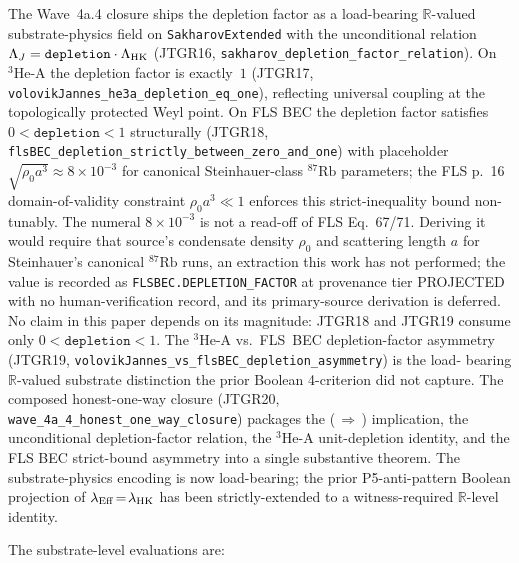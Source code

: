 \documentclass[aps,prd,reprint,nofootinbib,superscriptaddress]{revtex4-2}
\begin{document}
The Wave~4a.4 closure ships the depletion factor as a load-bearing
$\mathbb{R}$-valued substrate-physics field on \texttt{SakharovExtended}
with the unconditional relation $\Lambda_J = \texttt{depletion} \cdot
\Lambda_{\rm HK}$ (JTGR16,
\texttt{sakharov\_depletion\_factor\_relation}). On
$^3\!\text{He-A}$ the depletion factor is exactly~$1$ (JTGR17,
\texttt{volovikJannes\_he3a\_depletion\_eq\_one}), reflecting universal
coupling at the topologically protected Weyl point. On FLS BEC the
depletion factor satisfies $0 < \texttt{depletion} < 1$ structurally
(JTGR18, \texttt{flsBEC\_depletion\_strictly\_between\_zero\_and\_one})
with placeholder $\sqrt{\rho_0 a^3} \approx 8 \times 10^{-3}$ for
canonical Steinhauer-class $^{87}\text{Rb}$ parameters; the FLS p.~16
domain-of-validity constraint $\rho_0 a^3 \ll 1$
\cite{FinazziLiberatiSindoni2012Proc} enforces this
strict-inequality bound non-tunably. The numeral $8 \times 10^{-3}$ is
not a read-off of FLS Eq.~67/71. Deriving it would require that
source's condensate density $\rho_0$ and scattering length $a$ for
Steinhauer's canonical $^{87}\text{Rb}$ runs, an extraction this work
has not performed; the value is recorded as
\texttt{FLSBEC.DEPLETION\_FACTOR} at provenance tier PROJECTED with no
human-verification record, and its primary-source derivation is
deferred. No claim in this paper depends on its magnitude: JTGR18 and
JTGR19 consume only $0 < \texttt{depletion} < 1$. The
$^3\!\text{He-A}$
vs.\ FLS~BEC depletion-factor asymmetry (JTGR19,
\texttt{volovikJannes\_vs\_flsBEC\_depletion\_asymmetry}) is the load-
bearing $\mathbb{R}$-valued substrate distinction the prior Boolean
4-criterion did not capture. The composed honest-one-way closure
(JTGR20, \texttt{wave\_4a\_4\_honest\_one\_way\_closure}) packages the
(\,$\Rightarrow$\,) implication, the unconditional depletion-factor
relation, the $^3\!\text{He-A}$ unit-depletion identity, and the FLS
BEC strict-bound asymmetry into a single substantive theorem. The
substrate-physics encoding is now load-bearing; the prior P5-anti-pattern
Boolean projection of $\lambda_{\rm Eff}\!=\!\lambda_{\rm HK}$ has been
strictly-extended to a witness-required $\mathbb{R}$-level identity.

The substrate-level evaluations are:
\end{document}
